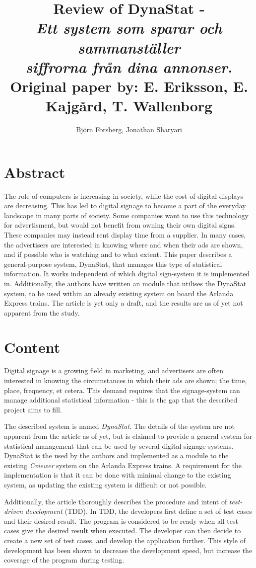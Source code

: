 \documentclass[a4paper,10pt]{article}
\title{Review of DynaStat - \\
	\emph{Ett system som sparar och sammanställer} \\
	\emph{siffrorna från dina annonser.}\\
	\vspace{3mm} \normalsize Original paper by: E. Eriksson, E. Kajgård, T. Wallenborg}
\author{Bj{\"o}rn Forsberg, Jonathan Sharyari}
\begin{document}
\maketitle


\section{Abstract}

The role of computers is increasing in society, while the cost of digital displays are decreasing. This has led to digital signage to become a part of the everyday landscape in many parts of society. Some companies want to use this technology for advertisment, but would not benefit from owning their own digital signs. These companies may instead rent display time from a supplier. In many cases, the advertisers are interested in knowing where and when their ads are shown, and if possible who is watching and to what extent. This paper describes a general-purpose system, DynaStat, that manages this type of statistical information. It works independent of which digital sign-system it is implemented in. Additionally, the authors have written an module that utilises the DynaStat system, to be used within an already existing system on board the Arlanda Express trains. The article is yet only a draft, and the results are as of yet not apparent from the study.

\section{Content}
Digital signage is a growing field in marketing, and advertisers are often interested in knowing the circumstances in which their ads are shown; the time, place, frequency, et cetera. This demand requires that the signage-system can manage additional statistical information - this is the gap that the described project aims to fill.

The described system is named \emph{DynaStat}. The details of the system are not apparent from the article as of yet, but is claimed to provide a general system for statistical management that can be used by several digital signage-systems. DynaStat is the used by the authors and implemented as a module to the existing \emph{Cviewer} system on the Arlanda Express trains. A requirement for the implementation is that it can be done with minimal change to the existing system, as updating the existing system is difficult or not possible.

Additionally, the article thoroughly describes the procedure and intent of \emph{test-driven development} (TDD). In TDD, the developers first define a set of test cases and their desired result. The program is considered to be ready when all test cases give the desired result when executed. The developer can then decide to create a new set of test cases, and develop the application further. This style of development has been shown to decrease the development speed, but increase the coverage of the program during testing.
\end{document}

